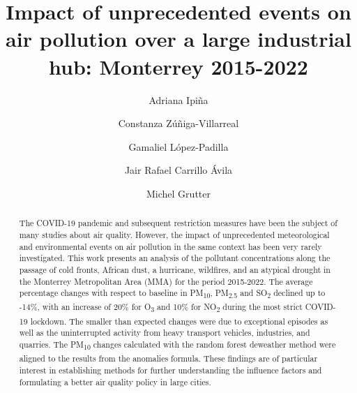 \documentclass[preprint,12pt]{elsarticle}
\begin{document}
\begin{frontmatter}
\title{
Impact of unprecedented events on air pollution over a large industrial hub: Monterrey 2015-2022
}
\author[1]{Adriana Ipiña}
\author[2]{Constanza Zúñiga-Villarreal}
\author[3]{Gamaliel López-Padilla}
\author[4]{Jair Rafael Carrillo Ávila}
\author[5]{Michel Grutter}
\vspace{-1em}
\begin{abstract}
The COVID-19 pandemic and subsequent restriction measures have been the subject of many studies about air quality. However, the impact of unprecedented meteorological and environmental events on air pollution in the same context has been very rarely investigated. This work presents an analysis of the pollutant concentrations along the passage of cold fronts, African dust, a hurricane, wildfires, and an atypical drought in the Monterrey Metropolitan Area (MMA) for the period 2015-2022. The average percentage changes with respect to baseline in PM\textsubscript{10}, PM\textsubscript{2.5} and SO\textsubscript{2} declined up to -14\%, with an increase of 20\% for O\textsubscript{3} and 10\% for NO\textsubscript{2} during the most strict COVID-19 lockdown. The smaller than expected changes were due to exceptional episodes as well as the uninterrupted activity from heavy transport vehicles, industries, and quarries. The PM\textsubscript{10} changes calculated with the random forest deweather method were aligned to the results from the anomalies formula. These findings are of particular interest in establishing methods for further understanding the influence factors and formulating a better air quality policy in large cities.%

\end{abstract}
\end{frontmatter}
\end{document}
